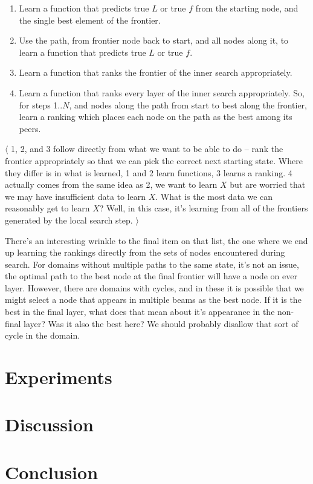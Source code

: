 \documentclass{report}
\newcommand{\note}[1]{$\langle$ #1 $\rangle$}
\begin{document}
\begin{enumerate}
  \item Learn a function that predicts true $L$ or true $f$ from the
    starting node, and the single best element of the frontier.
  \item Use the path, from frontier node back to start, and all nodes
    along it, to learn a function that predicts true $L$ or true $f$.
  \item Learn a function that ranks the frontier of the inner search
    appropriately.
  \item Learn a function that ranks every layer of the inner search
    appropriately.  So, for steps 1..$N$, and nodes along the path
    from start to best along the frontier, learn a ranking which
    places each node on the path as the best among its peers.
\end{enumerate}

\note{1, 2, and 3 follow directly from what we want to be able to do
  -- rank the frontier appropriately so that we can pick the correct
  next starting state.  Where they differ is in what is learned, 1 and
  2 learn functions, 3 learns a ranking. 4 actually comes from the
  same idea as 2, we want to learn $X$ but are worried that we may
  have insufficient data to learn $X$.  What is the most data we can
  reasonably get to learn $X$? Well, in this case, it's learning from
  all of the frontiers generated by the local search step.}

There's an interesting wrinkle to the final item on that list, the one
where we end up learning the rankings directly from the sets of nodes
encountered during search.  For domains without multiple paths to the
same state, it's not an issue, the optimal path to the best node at
the final frontier will have a node on ever layer.  However, there are
domains with cycles, and in these it is possible that we might select
a node that appears in multiple beams as the best node.  If it is the
best in the final layer, what does that mean about it's appearance in
the non-final layer?  Was it also the best here?  We should probably
disallow that sort of cycle in the domain.

\section{Experiments}

\section{Discussion}

\section{Conclusion}
\end{document}
